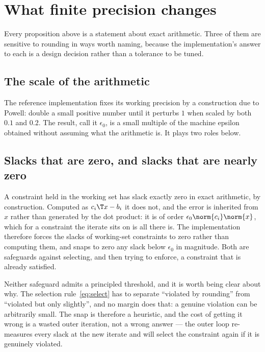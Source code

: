 \section{What finite precision changes}
\label{sec:arithmetic}

Every proposition above is a statement about exact arithmetic. Three of them are
sensitive to rounding in ways worth naming, because the implementation's answer to
each is a design decision rather than a tolerance to be tuned.

\subsection{The scale of the arithmetic}

The reference implementation fixes its working precision by a construction due to
Powell: double a small positive number until it perturbs $1$ when scaled by both
$0.1$ and $0.2$. The result, call it $\epsilon_0$, is a small multiple of the
machine epsilon obtained without assuming what the arithmetic is. It plays two
roles below.

\subsection{Slacks that are zero, and slacks that are nearly zero}

A constraint held in the working set has slack exactly zero in exact arithmetic,
by construction. Computed as $c_i\T x - b_i$ it does not, and the error is
inherited from $x$ rather than generated by the dot product: it is of order
$\epsilon_0 \norm{c_i}\norm{x}$, which for a constraint the iterate sits on is
all there is. The implementation therefore forces the slacks of working-set
constraints to zero rather than computing them, and snaps to zero any slack below
$\epsilon_0$ in magnitude. Both are safeguards against selecting, and then trying
to enforce, a constraint that is already satisfied.

Neither safeguard admits a principled threshold, and it is worth being clear about
why. The selection rule~\eqref{eq:select} has to separate ``violated by rounding''
from ``violated but only slightly'', and no margin does that: a genuine violation
can be arbitrarily small. The snap is therefore a heuristic, and the cost of
getting it wrong is a wasted outer iteration, not a wrong answer --- the outer loop
re-measures every slack at the new iterate and will select the constraint again if
it is genuinely violated.

